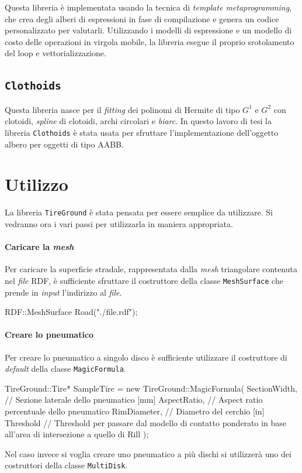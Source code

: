 Questa libreria è implementata usando la tecnica di \textit{template metaprogramming}, che crea degli alberi di espressioni in fase di compilazione e genera un codice personalizzato per valutarli. Utilizzando i modelli di espressione e un modello di costo delle operazioni in virgola mobile, la libreria esegue il proprio srotolamento del loop e vettorializzazione.
%
\subsection{\texttt{Clothoids}}
Questa libreria nasce per il \textit{fitting} dei polinomi di Hermite di tipo $G^1$ e $G^2$ con clotoidi, \textit{spline} di clotoidi, archi circolari e \textit{biarc}. In questo lavoro di tesi la libreria \texttt{Clothoids} è stata usata per sfruttare l'implementazione dell'oggetto albero per oggetti di tipo \ac{AABB}.
%
\section{Utilizzo}
La libreria \texttt{TireGround} è stata pensata per essere semplice da utilizzare. Si vedranno ora i vari passi per utilizzarla in maniera appropriata.
%
\paragraph{Caricare la \textit{mesh}}
Per caricare la superficie stradale, rappresentata dalla \textit{mesh} triangolare contenuta nel \textit{file} \ac{RDF}, è sufficiente sfruttare il costruttore della classe \texttt{MeshSurface} che prende in \textit{input} l'indirizzo al \textit{file}.
\begin{pseudoc}
	RDF::MeshSurface Road("./file.rdf");
\end{pseudoc}
%
\paragraph{Creare lo pneumatico}
Per creare lo pneumatico a singolo disco è sufficiente utilizzare il costruttore di \textit{default} della classe \texttt{MagicFormula}.
\begin{pseudoc}
	TireGround::Tire* SampleTire = new TireGround::MagicFormula(
		SectionWidth, // Sezione laterale dello pneumatico [mm]
		AspectRatio,  // Aspect ratio percentuale dello pneumatico
		RimDiameter,  // Diametro del cerchio [in]
		Threshold     // Threshold per passare dal modello di contatto ponderato in base all'area di intersezione a quello di Rill 
		);
\end{pseudoc}
Nel caso invece si voglia creare uno pneumatico a più dischi si utilizzerà uno dei costruttori della classe \texttt{MultiDisk}.

